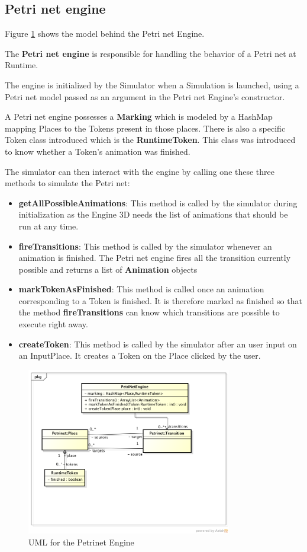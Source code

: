 \subsection{Petri net engine}

Figure \ref{fig:uml-petrinet-engine} shows the model behind the Petri net Engine.

The \textbf{Petri net engine} is responsible for handling the behavior of a Petri net at Runtime. 

The engine is initialized by the Simulator when a Simulation is launched, using a Petri net model passed as an argument in the Petri net Engine's constructor.

A Petri net engine possesses a \textbf{Marking} which is modeled by a HashMap mapping Places to the Tokens present in those places.
There is also a specific Token class introduced which is the \textbf{RuntimeToken}. This class was introduced to know whether a Token's animation was finished. 

The simulator can then interact with the engine by calling one these three methods to simulate the Petri net:

\begin{itemize}
  \item \textbf{getAllPossibleAnimations}: This method is called by the simulator during initialization as the Engine 3D needs the list of animations that should be run at any time. 
  \item \textbf{fireTransitions}: This method is called by the simulator whenever an animation is finished. The Petri net engine fires all the transition currently possible and returns a list of \textbf{Animation} objects
  \item \textbf{markTokenAsFinished}: This method is called once an animation corresponding to a Token is finished. It is therefore marked as finished so that the method \textbf{fireTransitions} can know which transitions are possible to execute right away.
  \item \textbf{createToken}: This method is called by the simulator after an user input on an InputPlace. It creates a Token on the Place clicked by the user.
\end{itemize}
 
\begin{figure}[htp]
\begin{center}
  \includegraphics[width=0.8\textwidth]{image/petrinet_engine.png}
  \caption{UML for the Petrinet Engine}
  \label{fig:uml-petrinet-engine}
\end{center}
\end{figure}


 

